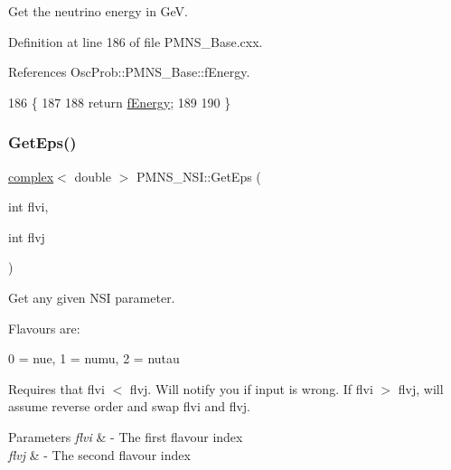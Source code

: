 Get the neutrino energy in GeV. 

Definition at line 186 of file P\+M\+N\+S\+\_\+\+Base.\+cxx.



References Osc\+Prob\+::\+P\+M\+N\+S\+\_\+\+Base\+::f\+Energy.


\begin{DoxyCode}
186                             \{
187 
188   \textcolor{keywordflow}{return} \hyperlink{classOscProb_1_1PMNS__Base_a2800af6d436972f3e900867790c046b0}{fEnergy};
189 
190 \}
\end{DoxyCode}
\mbox{\label{classOscProb_1_1PMNS__NSI_aac8925ae248f737fe7c3afb12f511534}} 
\subsubsection{\texorpdfstring{Get\+Eps()}{GetEps()}}
{\footnotesize\ttfamily \hyperlink{classOscProb_1_1PMNS__Base_ae86ec4718808ce9d02e5f5b4226714ab}{complex}$<$ double $>$ P\+M\+N\+S\+\_\+\+N\+S\+I\+::\+Get\+Eps (\begin{DoxyParamCaption}\item[{int}]{flvi,  }\item[{int}]{flvj }\end{DoxyParamCaption})\hspace{0.3cm}{\ttfamily [virtual]}}

Get any given N\+SI parameter.

Flavours are\+:~\newline

\begin{DoxyItemize}
\item 0 = nue, 1 = numu, 2 = nutau
\end{DoxyItemize}

Requires that flvi $<$ flvj. Will notify you if input is wrong. If flvi $>$ flvj, will assume reverse order and swap flvi and flvj.


\begin{DoxyParams}{Parameters}
{\em flvi} & -\/ The first flavour index \\
\hline
{\em flvj} & -\/ The second flavour index \\
\hline
\end{DoxyParams}


